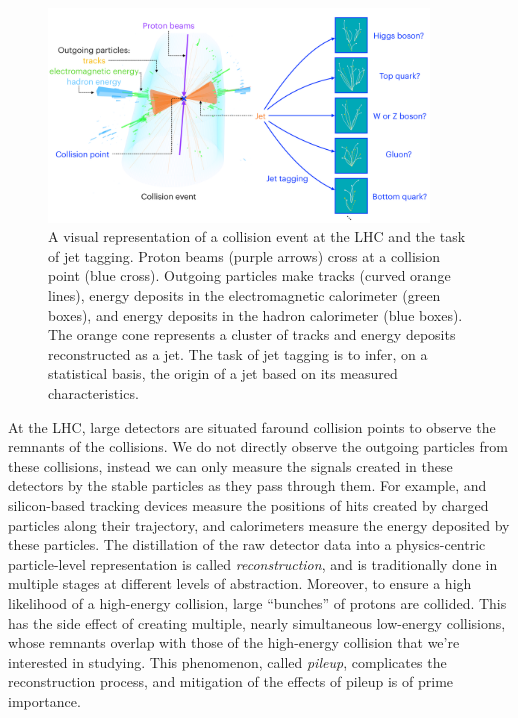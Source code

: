 \documentclass[11pt,letterpaper,notitlepage]{article}
\begin{document}
\begin{figure}[htb!]
    \centering
    \includegraphics[width=0.9\textwidth]{jet_tagging.pdf}
    \caption{
        A visual representation of a collision event at the LHC and the task of jet tagging.
        Proton beams (purple arrows) cross at a collision point (blue cross).
        Outgoing particles make tracks (curved orange lines), energy deposits in the electromagnetic calorimeter (green boxes), and energy deposits in the hadron calorimeter (blue boxes).
        The orange cone represents a cluster of tracks and energy deposits reconstructed as a jet.
        The task of jet tagging is to infer, on a statistical basis, the origin of a jet based on its measured characteristics.
        \label{fig:jet_tagging}
    }
\end{figure}

At the LHC, large detectors are situated ƒaround collision points to observe the remnants of the collisions.
We do not directly observe the outgoing particles from these collisions, instead we can only measure the signals created in these detectors by the stable particles as they pass through them.
For example, and silicon-based tracking devices measure the positions of hits created by charged particles along their trajectory, and calorimeters measure the energy deposited by these particles.
The distillation of the raw detector data into a physics-centric particle-level representation is called \emph{reconstruction}, and is traditionally done in multiple stages at different levels of abstraction.
Moreover, to ensure a high likelihood of a high-energy collision, large ``bunches'' of protons are collided.
This has the side effect of creating multiple, nearly simultaneous low-energy collisions, whose remnants overlap with those of the high-energy collision that we're interested in studying.
This phenomenon, called \emph{pileup}, complicates the reconstruction process, and mitigation of the effects of pileup is of prime importance.
\end{document}
